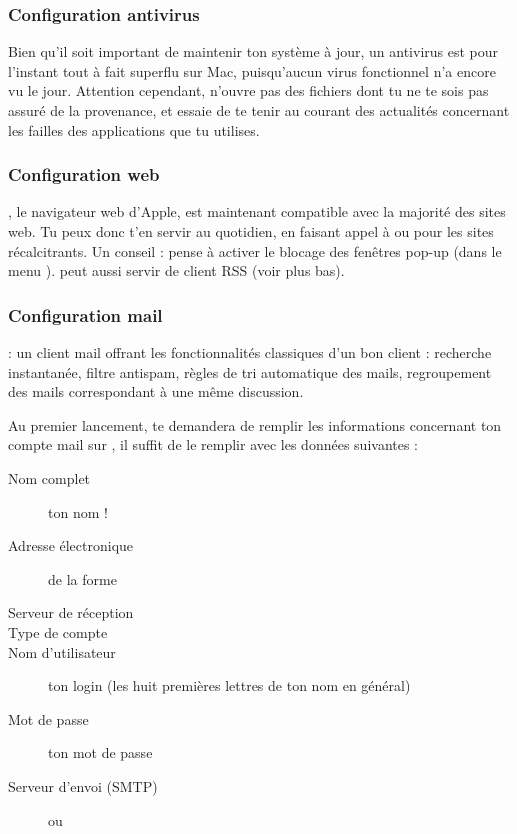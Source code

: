 
\subsubsection{Configuration antivirus}

Bien qu'il soit important de maintenir ton système à jour, un antivirus est pour l'instant tout à fait superflu sur Mac, puisqu'aucun virus fonctionnel n'a encore vu le jour. Attention cependant, n'ouvre pas des fichiers dont tu ne te sois pas assuré de la provenance, et essaie de te tenir au courant des actualités concernant les failles des applications que tu utilises.


\subsubsection{Configuration web}

 , le navigateur web d'Apple, est maintenant compatible avec la majorité des sites web. Tu peux donc t'en servir au quotidien, en faisant appel à  ou  pour les sites récalcitrants. Un conseil : pense à activer le blocage des fenêtres pop-up (dans le menu ).  peut aussi servir de client RSS (voir plus bas).\\

\subsubsection{Configuration mail}

  : un client mail offrant les fonctionnalités classiques d'un bon client : recherche instantanée, filtre antispam, règles de tri automatique des mails, regroupement des mails correspondant à une même discussion.

Au premier lancement,  te demandera de remplir les informations concernant ton compte mail sur , il suffit de le remplir avec les données suivantes :

\begin{description}
  \item[Nom complet] ton nom !
  \item[Adresse électronique] de la forme 
  \item[Serveur de réception] 
  \item[Type de compte] 
  \item[Nom d'utilisateur] ton login  (les huit premières lettres de ton nom en général)
  \item[Mot de passe] ton mot de passe 
  \item[Serveur d'envoi (SMTP)]  ou 
\end{description}

